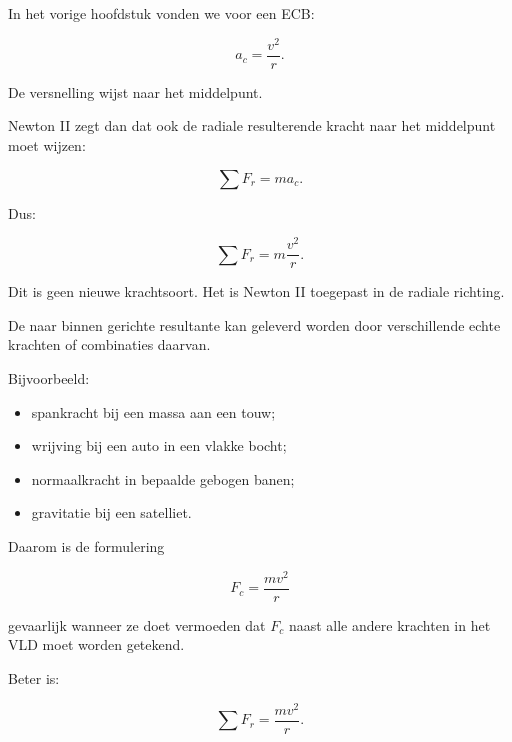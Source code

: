 \documentclass{ximera}
\begin{document}


In het vorige hoofdstuk vonden we voor een ECB:

\[
\boxed{
a_c=\frac{v^2}{r}.
}
\]

De versnelling wijst naar het middelpunt.

Newton II zegt dan dat ook de radiale resulterende kracht naar het
middelpunt moet wijzen:

\[
\sum F_r=ma_c.
\]

Dus:

\[
\boxed{
\sum F_r
=
m\frac{v^2}{r}.
}
\]

Dit is geen nieuwe krachtsoort. Het is Newton II toegepast in de
radiale richting.



De naar binnen gerichte resultante kan geleverd worden door verschillende
echte krachten of combinaties daarvan.

Bijvoorbeeld:

\begin{itemize}
  \item spankracht bij een massa aan een touw;
  \item wrijving bij een auto in een vlakke bocht;
  \item normaalkracht in bepaalde gebogen banen;
  \item gravitatie bij een satelliet.
\end{itemize}

Daarom is de formulering

\[
F_c=\frac{mv^2}{r}
\]

gevaarlijk wanneer ze doet vermoeden dat $F_c$ naast alle andere
krachten in het VLD moet worden getekend.

Beter is:

\[
\boxed{
\sum F_r=\frac{mv^2}{r}.
}
\]
\end{document}

